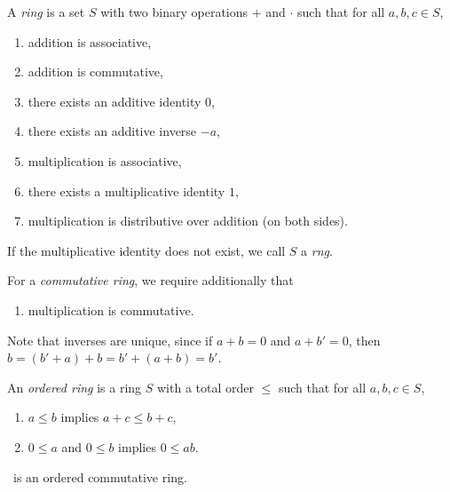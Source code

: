 \begin{definition}[Ring] \label{def:ring}
    A \emph{ring} is a set $S$ with two binary operations $+$ and $\cdot$ such
    that for all $a, b, c \in S$,
    \begin{enumerate}[label=\small(R\arabic*)]
        \item addition is associative, \label{def:ring:asso}
        \item addition is commutative, \label{def:ring:comm}
        \item there exists an additive identity $0$, \label{def:ring:zero}
        \item there exists an additive inverse $-a$, \label{def:ring:inverse}
        \item multiplication is associative, \label{def:ring:mult_asso}
        \item there exists a multiplicative identity $1$, \label{def:ring:one}
        \item multiplication is distributive over addition (on both sides).
        \label{def:ring:dist}
    \end{enumerate}
    If the multiplicative identity does not exist, we call $S$ a
    \emph{rng}.

    For a \emph{commutative ring}, we require additionally that
    \begin{enumerate}[label=\small(CR\arabic*)]
        \item multiplication is commutative. \label{def:ring:mult_comm}
    \end{enumerate}
\end{definition}
Note that inverses are unique, since if $a + b = 0$ and $a + b' = 0$, then
$b = (b' + a) + b = b' + (a + b) = b'$.

\begin{definition} \label{def:ordered_ring}
    An \emph{ordered ring} is a ring $S$ with a total order $\le$ such that
    for all $a, b, c \in S$,
    \begin{enumerate}[label=\small(OR\arabic*)]
        \item $a \le b$ implies $a + c \le b + c$,
            \label{def:ordered_ring:sum}
        \item $0 \le a$ and $0 \le b$ implies $0 \le ab$.
            \label{def:ordered_ring:prod}
    \end{enumerate}
\end{definition}

\begin{theorem}[Algebra of \Z]
    \Z\ is an ordered commutative ring.
\end{theorem}

